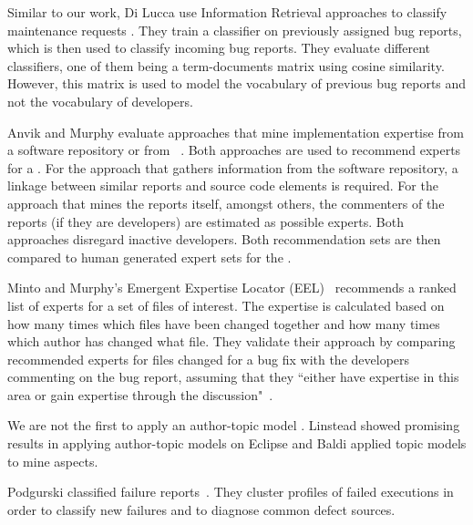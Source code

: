 Similar to our work, Di Lucca \etal use Information Retrieval approaches to classify maintenance requests \cite{Lucc02b}. They train a classifier on previously assigned bug reports, which is then used to classify incoming bug reports. They evaluate different classifiers, one of them being a term-documents matrix using cosine similarity. However, this matrix is used to model the vocabulary of previous bug reports and not the vocabulary of developers.

Anvik and Murphy evaluate approaches that mine implementation expertise from a software repository or from \BRs~\cite{Anvik07}. Both approaches are used to recommend experts for a \BR. For the approach that gathers information from the software repository, a linkage between similar reports and source code elements is required. For the approach that mines the reports itself, amongst others, the commenters of the reports (if they are developers) are estimated as possible experts. Both approaches disregard inactive developers. Both recommendation sets are then compared to human generated expert sets for the \BR.

Minto and Murphy's Emergent Expertise Locator (EEL)~\cite{Minto07} recommends a ranked list of experts for a set of files of interest. The expertise is calculated based on how many times which files have been changed together and how many times which author has changed what file. They validate their approach by comparing recommended experts for files changed for a bug fix with the developers commenting on the bug report, assuming that they ``either have expertise in this area or gain expertise through the discussion"~\cite{Minto07}.


We are not the first to apply an author-topic model \cite{Linstead07, Bald08a}. Linstead \etal showed promising results in applying author-topic models on Eclipse and Baldi \etal applied topic models to mine aspects.

Podgurski \etal classified failure reports~\cite{Podgurski03}. They cluster profiles of failed executions in order to classify new failures and to diagnose common defect sources.

